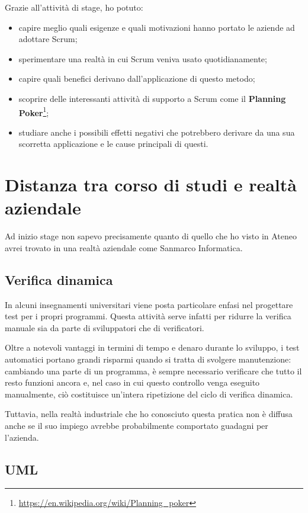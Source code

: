 Grazie all'attività di stage, ho potuto:

\begin{itemize}
\item capire meglio quali esigenze e quali motivazioni hanno portato le aziende
  ad adottare Scrum;
\item sperimentare una realtà in cui Scrum veniva usato quotidianamente;
\item capire quali benefici derivano dall'applicazione di questo metodo;
\item scoprire delle interessanti attività di supporto a Scrum come il
  \textbf{Planning
  Poker}\footnote{\url{https://en.wikipedia.org/wiki/Planning_poker}};
\item studiare anche i possibili effetti negativi che potrebbero derivare da
  una sua scorretta applicazione e le cause principali di questi.
\end{itemize}

\section{Distanza tra corso di studi e realtà aziendale}

Ad inizio stage non sapevo precisamente quanto di quello che ho visto in Ateneo
avrei trovato in una realtà aziendale come Sanmarco Informatica.

\subsection{Verifica dinamica}

In alcuni insegnamenti universitari viene posta particolare enfasi nel
progettare test per i propri programmi.
Questa attività serve infatti per ridurre la verifica manuale sia da parte di
sviluppatori che di verificatori.

Oltre a notevoli vantaggi in termini di tempo e denaro durante lo sviluppo, i
test automatici portano grandi risparmi quando si tratta di svolgere
manutenzione: cambiando una parte di un programma, è sempre necessario
verificare che tutto il resto funzioni ancora e, nel caso in cui questo
controllo venga eseguito manualmente, ciò costituisce un'intera ripetizione del
ciclo di verifica dinamica.

Tuttavia, nella realtà industriale che ho conosciuto questa pratica non è
diffusa anche se il suo impiego avrebbe probabilmente comportato guadagni per
l'azienda.

\subsection{UML}

